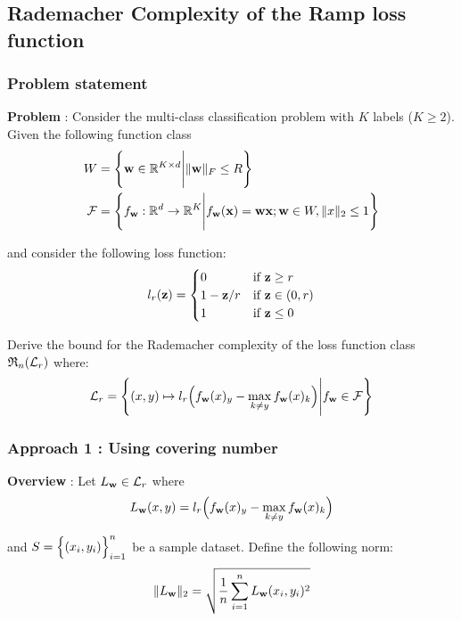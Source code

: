\newpage
\subsection{Rademacher Complexity of the Ramp loss function}

\subsubsection{Problem statement}
\textbf{Problem} : Consider the multi-class classification problem with $K$ labels ($K\ge2$). Given the following function class
\begin{align*}
    W  &= \Bigg\{ 
        {\bf w}\in \mathbb{R}^{K\times d} \Bigg| \|{\bf w}\|_F \le R
     \Bigg\} \\
    \mathcal{F} &= \Bigg\{ 
        f_{{\bf w}}:\mathbb{R}^d \to \mathbb{R}^{K} \Bigg| f_{\bf w}({\bf x}) = {\bf wx}; {\bf w}\in W, \|x\|_2\le 1
     \Bigg\}
\end{align*}

\noindent and consider the following loss function:
\begin{align*}
    l_r({\bf z}) &= \begin{cases}
        0 & \text{if } {\bf z} \ge r \\
        1 - {\bf z}/r &\text{if } {\bf z} \in (0,r) \\ 
        1 &\text{if } {\bf z} \le 0
    \end{cases} \\
\end{align*}

\noindent Derive the bound for the Rademacher complexity of the loss function class $\mathfrak{R}_n(\mathcal{L}_r)$ where:
\begin{align*}
    \mathcal{L}_r = \Bigg\{ 
        (x, y)\mapsto l_r\Big(  f_{\bf w}(x)_y - \max_{k\ne y} f_{\bf w}(x)_k  \Big) \Bigg| f_{{\bf w}} \in \mathcal{F} 
     \Bigg\}
\end{align*}

\subsubsection{Approach 1 : Using covering number}
\noindent\textbf{Overview} : Let $L_{\bf w} \in \mathcal{L}_r$ where
\begin{align*}
    L_{\bf w}(x,y) =  l_r\Big(  f_{\bf w}(x)_y - \max_{k\ne y} f_{\bf w}(x)_k  \Big)
\end{align*}


\noindent and $S=\Big\{ (x_i, y_i) \Big\}_{i=1}^n$ be a sample dataset. Define the following norm:
\begin{align*}
    \|L_{\bf w}\|_2 = \sqrt{
        \frac{1}{n} \sum_{i=1}^n L_{\bf w}(x_i, y_i)^2
    }
\end{align*}

